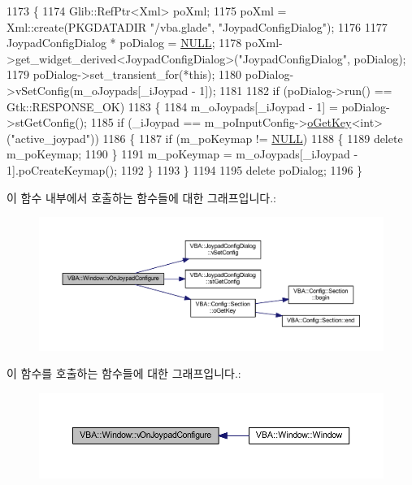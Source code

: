 \begin{DoxyCode}
1173 \{
1174   Glib::RefPtr<Xml> poXml;
1175   poXml = Xml::create(PKGDATADIR \textcolor{stringliteral}{"/vba.glade"}, \textcolor{stringliteral}{"JoypadConfigDialog"});
1176 
1177   JoypadConfigDialog * poDialog = \mbox{\hyperlink{getopt1_8c_a070d2ce7b6bb7e5c05602aa8c308d0c4}{NULL}};
1178   poXml->get\_widget\_derived<JoypadConfigDialog>(\textcolor{stringliteral}{"JoypadConfigDialog"}, poDialog);
1179   poDialog->set\_transient\_for(*\textcolor{keyword}{this});
1180   poDialog->vSetConfig(m\_oJoypads[\_iJoypad - 1]);
1181 
1182   \textcolor{keywordflow}{if} (poDialog->run() == Gtk::RESPONSE\_OK)
1183   \{
1184     m\_oJoypads[\_iJoypad - 1] = poDialog->stGetConfig();
1185     \textcolor{keywordflow}{if} (\_iJoypad == m\_poInputConfig->\mbox{\hyperlink{class_v_b_a_1_1_config_1_1_section_ab169d7aae4e9dde91418ba1668e3ad39}{oGetKey}}<\textcolor{keywordtype}{int}>(\textcolor{stringliteral}{"active\_joypad"}))
1186     \{
1187       \textcolor{keywordflow}{if} (m\_poKeymap != \mbox{\hyperlink{getopt1_8c_a070d2ce7b6bb7e5c05602aa8c308d0c4}{NULL}})
1188       \{
1189         \textcolor{keyword}{delete} m\_poKeymap;
1190       \}
1191       m\_poKeymap = m\_oJoypads[\_iJoypad - 1].poCreateKeymap();
1192     \}
1193   \}
1194 
1195   \textcolor{keyword}{delete} poDialog;
1196 \}
\end{DoxyCode}
이 함수 내부에서 호출하는 함수들에 대한 그래프입니다.\+:
\nopagebreak
\begin{figure}[H]
\begin{center}
\leavevmode
\includegraphics[width=350pt]{class_v_b_a_1_1_window_a9a72206ce2e6c13d5bd66863292f9515_cgraph}
\end{center}
\end{figure}
이 함수를 호출하는 함수들에 대한 그래프입니다.\+:
\nopagebreak
\begin{figure}[H]
\begin{center}
\leavevmode
\includegraphics[width=350pt]{class_v_b_a_1_1_window_a9a72206ce2e6c13d5bd66863292f9515_icgraph}
\end{center}
\end{figure}
\mbox{\label{class_v_b_a_1_1_window_a38491fe3a0daf6be7ab610fd282d2e47}} 
